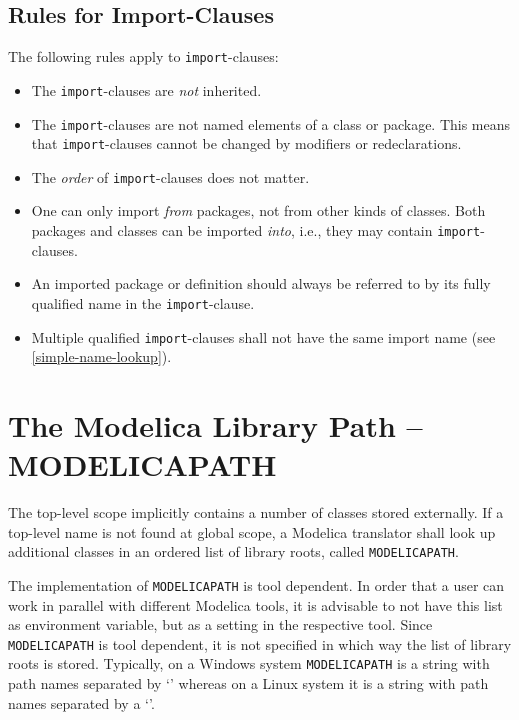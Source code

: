 \subsection{Rules for Import-Clauses}\label{summary-of-rules-for-import-clauses}\label{rules-for-import-clauses}

The following rules apply to \lstinline!import!-clauses:
\begin{itemize}
\item
  The \lstinline!import!-clauses are \emph{not} inherited.
\item
  The \lstinline!import!-clauses are not named elements of a class or package.
  This means that \lstinline!import!-clauses cannot be changed by modifiers or redeclarations.
\item
  The \emph{order} of \lstinline!import!-clauses does not matter.
\item
  One can only import \emph{from} packages, not from other kinds of classes.
  Both packages and classes can be imported \emph{into}, i.e., they may contain \lstinline!import!-clauses.
\item
  An imported package or definition should always be referred to by its fully qualified name in the \lstinline!import!-clause.
\item
  Multiple qualified \lstinline!import!-clauses shall not have the same import name (see \cref{simple-name-lookup}).
\end{itemize}


\section{The Modelica Library Path -- MODELICAPATH}\label{the-modelica-library-path-modelicapath}

The top-level scope implicitly contains a number of classes stored externally.
If a top-level name is not found at global scope, a Modelica translator shall look up additional classes in an ordered list of library roots, called \lstinline!MODELICAPATH!.

\begin{nonnormative}
The implementation of \lstinline!MODELICAPATH! is tool dependent.
In order that a user can work in parallel with different Modelica tools, it is advisable to not have this list as environment variable, but as a setting in the respective tool.
Since \lstinline!MODELICAPATH! is tool dependent, it is not specified in which way the list of library roots is stored.
Typically, on a Windows system \lstinline!MODELICAPATH! is a string with path names separated by `\filename{;}' whereas on a Linux system it is a string with path names separated by a `\filename{:}'.
\end{nonnormative}

